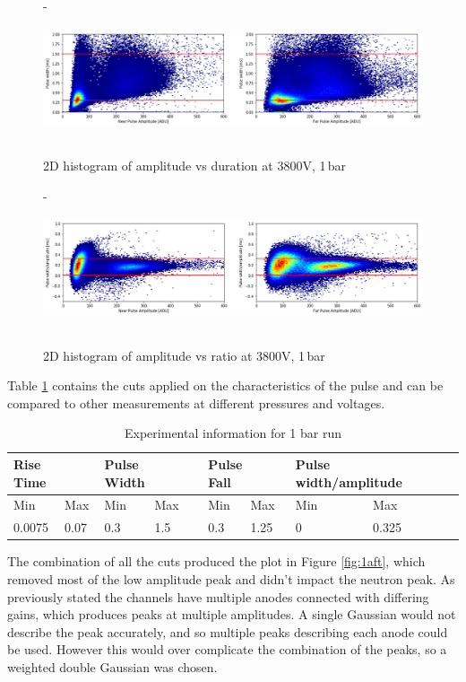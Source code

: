 \documentclass[a4paper]{article}
\begin{document}
\begin{figure}[H]- 
    \centering
    \includegraphics[height=3.7cm]{uk24n001_dur.png}
    \caption{2D histogram of amplitude vs duration at 3800V, 1\,bar}
    \label{fig:1dur}
\end{figure}
\begin{figure}[H]-
    \centering
    \includegraphics[height=3.7cm]{uk24n001_len.png}
    \caption{2D histogram of amplitude vs ratio at 3800V, 1\,bar}
    \label{fig:1len}
\end{figure}
\noindent Table \ref{tb:1cuts} contains the cuts applied on the characteristics of the pulse and can be compared to other measurements at different pressures and voltages.
\begin{table}[H]
\centering
\caption{Experimental information for 1 bar run}
\begin{tabular}{|l|l|l|l|l|l|l|l|} 
\hline
\multicolumn{2}{|l|}{Rise Time~~ } & \multicolumn{2}{l|}{Pulse Width~~ } & \multicolumn{2}{l|}{Pulse Fall~~ } & \multicolumn{2}{l|}{Pulse width/amplitude~~ }  \\ 
\hline
Min                         & Max  & Min                     & Max       & Min                     & Max      & Min                   & Max                    \\ 
\hline
\multicolumn{1}{|l}{0.0075} & 0.07 & \multicolumn{1}{l}{0.3} & 1.5       & \multicolumn{1}{l}{0.3} & 1.25     & \multicolumn{1}{l}{0} & 0.325                  \\
\hline
\end{tabular}
\label{tb:1cuts}
\end{table}
\noindent The combination of all the cuts produced the plot in Figure \ref{fig:1aft}, which removed most of the low amplitude peak and didn't impact the neutron peak. As previously stated the channels have multiple anodes connected with differing gains, which produces peaks at multiple amplitudes. A single Gaussian would not describe the peak accurately, and so multiple peaks describing each anode could be used. However this would over complicate the combination of the peaks, so a weighted double Gaussian was chosen. 
\end{document}
